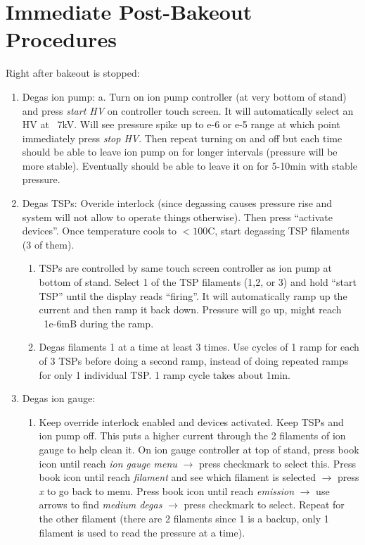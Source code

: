 \section{Immediate Post-Bakeout Procedures}
Right after bakeout is stopped:
\begin{enumerate}
\item	Degas ion pump:
a.	Turn on ion pump controller (at very bottom of stand) and press \emph{start HV} on controller touch screen. It will automatically select an HV at ~7kV. Will see pressure spike up to e-6 or e-5 range at which point immediately press \emph{stop HV}.  Then repeat turning on and off but each time should be able to leave ion pump on for longer intervals (pressure will be more stable). Eventually should be able to leave it on for 5-10min with stable pressure.
\item	Degas TSPs: 
Overide interlock (since degassing causes pressure rise and system will not allow to operate things otherwise). Then press “activate devices”. Once temperature cools to $<100$C, start degassing TSP filaments (3 of them).  
\begin{enumerate}
\item	TSPs are controlled by same touch screen controller as ion pump at bottom of stand. Select 1 of the TSP filaments (1,2, or 3) and hold “start TSP” until the display reads “firing”. It will automatically ramp up the current and then ramp it back down. Pressure will go up, might reach ~1e-6mB during the ramp. 
\item	Degas filaments 1 at a time at least 3 times. Use cycles of 1 ramp for each of 3 TSPs before doing a second ramp, instead of doing repeated ramps for only 1 individual TSP. 1 ramp cycle takes about 1min. 
\end{enumerate}
\item	Degas ion gauge: 
\begin{enumerate}
\item	Keep override interlock enabled and devices activated. Keep TSPs and ion pump off. This puts a higher current through the 2 filaments of ion gauge to help clean it. On ion gauge controller at top of stand, press book icon until reach \emph{ion gauge menu} $\rightarrow$ press checkmark to select this. Press book icon until reach \emph{filament} and see which filament is selected $\rightarrow$ press \emph{x} to go back to menu. Press book icon until reach \emph{emission} $\rightarrow$ use arrows to find \emph{medium degas} $\rightarrow$ press checkmark to select. Repeat for the other filament (there are 2 filaments since 1 is a backup, only 1 filament is used to read the pressure at a time).

\end{enumerate}
\end{enumerate}
